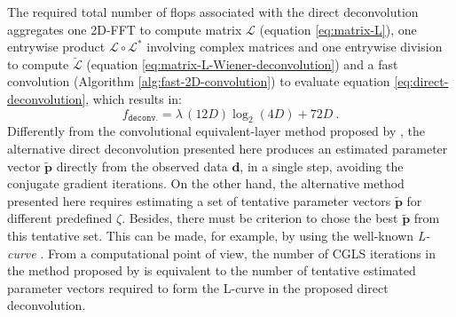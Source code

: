 The required total number of flops associated with the direct deconvolution 
aggregates one 2D-FFT to compute matrix $\boldsymbol{\mathcal{L}}$ (equation \ref{eq:matrix-L}),
one entrywise product $\boldsymbol{\mathcal{L}} \circ \boldsymbol{\mathcal{L}}^{\ast}$ involving complex matrices and
one entrywise division to compute $\breve{\boldsymbol{\mathcal{L}}}$ (equation \ref{eq:matrix-L-Wiener-deconvolution}) and
a fast convolution (Algorithm \ref{alg:fast-2D-convolution}) to evaluate equation \ref{eq:direct-deconvolution},
which results in:
\begin{equation}
	f_{\mathtt{deconv.}} = \lambda \, (12D)\log_{2}(4D) + 72D \: .
	\label{flops:direct-deconv}
\end{equation}
Differently from the convolutional equivalent-layer method proposed by 
\citet{takahashi-etal2020, takahashi-etal2022}, the alternative direct deconvolution presented here 
produces an estimated parameter vector $\tilde{\mathbf{p}}$ directly from the observed data $\mathbf{d}$, in a single step,
avoiding the conjugate gradient iterations.
On the other hand, the alternative method presented here requires estimating a set of tentative parameter vectors $\tilde{\mathbf{p}}$
for different predefined $\zeta$. Besides, there must be criterion to chose the best $\tilde{\mathbf{p}}$ from this tentative set.
This can be made, for example, by using the well-known \textit{L-curve} \citep{hansen1992}.
From a computational point of view, the number of CGLS iterations in the method proposed by \citet{takahashi-etal2020, takahashi-etal2022}
is equivalent to the number of tentative estimated parameter vectors required to form the L-curve in the proposed
direct deconvolution.